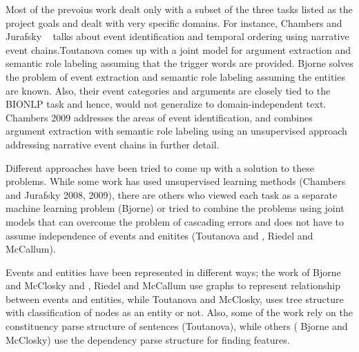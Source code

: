 Most of the prevoius work dealt only with a subset of the three tasks listed as the project goals and dealt with very specific domains.  For instance, Chambers and Jurafsky ~ talks about event identification and temporal ordering using narrative event chains.Toutanova comes up with a joint model for argument extraction and semantic role labeling assuming that the trigger words are provided. Bjorne solves the problem of event extraction and semantic role labeling assuming the entities are known. Also, their event categories and arguments are closely tied to the BIONLP task and hence, would not generalize to domain-independent text. Chambers 2009 addresses the areas of event identification, and combines argument extraction with semantic role labeling using an unsupervised approach addressing narrative event chains in further detail. 

Different approaches have been tried to come up with a solution to these problems. While some work has used unsupervised learning methods (Chambers and Jurafsky 2008, 2009), there are others who viewed each task as a separate machine learning problem (Bjorne) or tried to combine the problems using joint models that can overcome the problem of cascading errors and does not have to assume independence of events and enitites (Toutanova and , Riedel and McCallum).

Events and entities have been represented in different ways; the work of Bjorne and McClosky and , Riedel and McCallum use graphs to represent relationship between events and entities, while Toutanova and McClosky, uses tree structure with classification of nodes as an entity or not. Also, some of the work rely on the constituency parse structure of sentences (Toutanova), while others ( Bjorne and McClosky) use the dependency parse structure for finding features. 


